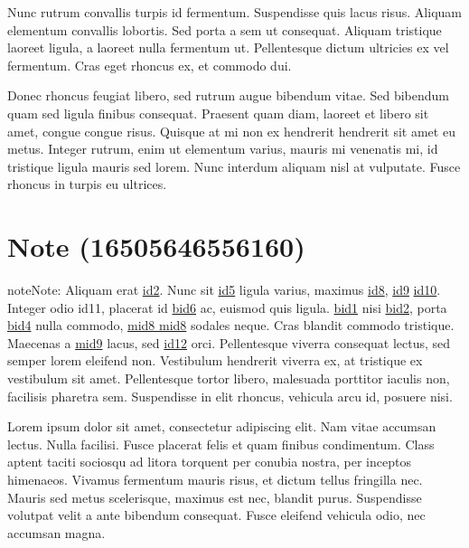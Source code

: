 \sphinxAtStartPar
Nunc rutrum convallis turpis id fermentum. Suspendisse quis lacus risus. Aliquam elementum convallis
lobortis. Sed porta a sem ut consequat. Aliquam tristique laoreet ligula, a laoreet nulla fermentum
ut. Pellentesque dictum ultricies ex vel fermentum. Cras eget rhoncus ex, et commodo dui.

\sphinxAtStartPar
Donec rhoncus feugiat libero, sed rutrum augue bibendum vitae. Sed bibendum quam sed ligula finibus
consequat. Praesent quam diam, laoreet et libero sit amet, congue congue risus. Quisque at mi non ex
hendrerit hendrerit sit amet eu metus. Integer rutrum, enim ut elementum varius, mauris mi venenatis
mi, id tristique ligula mauris sed lorem. Nunc interdum aliquam nisl at vulputate. Fusce rhoncus in
turpis eu ultrices.


\section{Note (16505646556160)}
\label{\detokenize{test:note-16505646556160}}
\begin{sphinxadmonition}{note}{Note:}
\sphinxAtStartPar
Aliquam erat \hyperlink{\detokenize{id2}}{id2}. Nunc sit \hyperlink{\detokenize{id5}}{id5} ligula varius, maximus
\hyperlink{\detokenize{id8}}{id8}, \hyperlink{\detokenize{id9}}{id9} \hyperlink{\detokenize{id10}}{id10}. Integer odio
\hypertarget{\detokenize{id11}}{id11}, placerat id \hyperlink{\detokenize{bid6-ref46}}{\hypertarget{\detokenize{bid6}}{bid6}} ac, euismod quis ligula.
\hyperlink{\detokenize{bid1}}{\hypertarget{\detokenize{bid1-ref38}}{bid1}} nisi \hyperlink{\detokenize{bid2}}{\hypertarget{\detokenize{bid2-ref39}}{bid2}}, porta \hyperlink{\detokenize{bid4}}{\hypertarget{\detokenize{bid4-ref40}}{bid4}} nulla
commodo, \hyperlink{\detokenize{test-mid8-id0}}{\hypertarget{\detokenize{test-mid8-id1}}{mid8 mid8}} sodales neque. Cras blandit commodo tristique. Maecenas a
\hyperlink{\detokenize{test-mid9-id1}}{\hypertarget{\detokenize{test-mid9-id0}}{mid9}} lacus, sed \hyperlink{\detokenize{id12}}{id12} orci.
Pellentesque viverra consequat lectus, sed semper lorem eleifend non. Vestibulum hendrerit viverra
ex, at tristique ex vestibulum sit amet. Pellentesque tortor libero, malesuada porttitor iaculis
non, facilisis pharetra sem. Suspendisse in elit rhoncus, vehicula arcu id, posuere nisi.
\end{sphinxadmonition}

\sphinxAtStartPar
Lorem ipsum dolor sit amet, consectetur adipiscing elit. Nam vitae accumsan lectus. Nulla facilisi.
Fusce placerat felis et quam finibus condimentum. Class aptent taciti sociosqu ad litora torquent
per conubia nostra, per inceptos himenaeos. Vivamus fermentum mauris risus, et dictum tellus
fringilla nec. Mauris sed metus scelerisque, maximus est nec, blandit purus. Suspendisse volutpat
velit a ante bibendum consequat. Fusce eleifend vehicula odio, nec accumsan magna.

